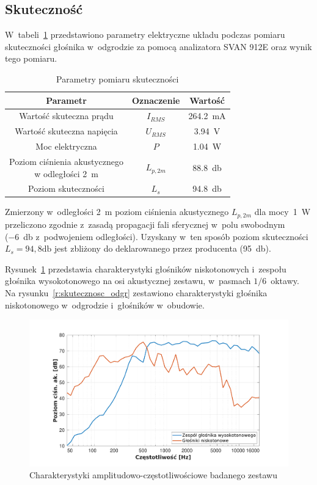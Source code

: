 \documentclass[12pt]{oska}
\begin{document}
	
	\subsection{Skuteczność}
	
	W~tabeli~\ref{t:skutecznosc} przedstawiono parametry elektryczne układu podczas pomiaru skuteczności głośnika w~odgrodzie za pomocą analizatora SVAN 912E oraz wynik tego pomiaru.
	
	\begin{table}[!ht]
		\centering
		\caption{Parametry pomiaru skuteczności}
		\label{t:skutecznosc}
		\begin{tabular}{|c|c|c|}
			\hline
			\textbf{Parametr} & \textbf{Oznaczenie} & \textbf{Wartość} \\\hline
			Wartość skuteczna prądu & $I_{RMS}$ & \SI{264,2}{\milli\ampere} \\\hline
			Wartość skuteczna napięcia & $U_{RMS}$ & \SI{3,94}{\volt} \\\hline
			Moc elektryczna & $P$ & \SI{1,04}{\watt} \\\hline
			\makecell{Poziom ciśnienia akustycznego\\w odległości \SI{2}{\metre}} & $L_{p,2m}$ & \SI{88,8}{\decibel} \\\hline
			Poziom skuteczności & $L_{s}$ & \SI{94,8}{\decibel} \\\hline
		\end{tabular}
	\end{table}
	
	Zmierzony w~odległości \SI{2}{\metre} poziom ciśnienia akustycznego $L_{p,2m}$ dla mocy~\SI{1}{\watt} przeliczono zgodnie z~zasadą propagacji fali sferycznej w~polu swobodnym (\SI{-6}{\decibel} z~podwojeniem odległości). Uzyskany w~ten sposób poziom skuteczności $L_{s}=94,8\si{\decibel}$ jest zbliżony do deklarowanego przez producenta (\SI{95}{\decibel}).
	
	Rysunek~\ref{r:skutecznosc} przedstawia charakterystyki głośników niskotonowych i~zespołu głośnika wysokotonowego na osi akustycznej zestawu, w~pasmach $1/6$~oktawy. Na rysunku~\ref{r:skutecznosc_odgr} zestawiono charakterystyki głośnika niskotonowego w~odgrodzie i~głośników w~obudowie.
	
	\begin{figure}[!ht]
		\centering
		\includegraphics[width=.8\textwidth,trim={2cm .5cm 2cm 1cm},clip]{stolik_skutecznosci.pdf}
		\caption{Charakterystyki amplitudowo-częstotliwościowe badanego zestawu}
		\label{r:skutecznosc}
	\end{figure}
\end{document}

